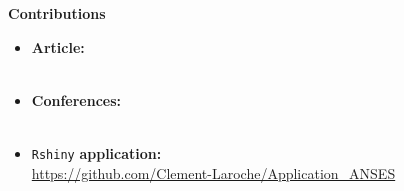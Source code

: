 {\Large\textbf{Contributions}}
\begin{itemize}
\item \textbf{Article:} \\ 
 \\
\item \textbf{Conferences:} \\
 \\
\item \texttt{Rshiny} \textbf{application:} \\
\url{https://github.com/Clement-Laroche/Application_ANSES}
\end{itemize}
